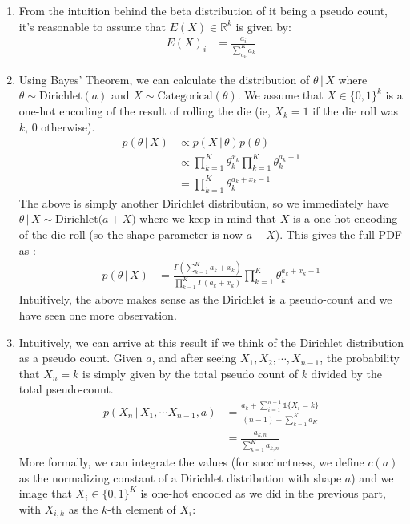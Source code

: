 \documentclass[submit]{harvardml}
\newcommand{\given}{\,|\,}
\theoremstyle{plain}
\begin{document}
\begin{enumerate}[label=(\alph*)]
\item From the intuition behind the beta distribution of it being a pseudo count, it's reasonable to assume that $E(X) \in \mathbb{R}^k$ is given by:
\begin{align*}
E(X)_i &= \frac{a_i}{\sum_{a_k}^K a_k}
\end{align*}
\item Using Bayes' Theorem, we can calculate the distribution of $\theta \given X$ where $\theta \sim \text{Dirichlet}(a)$ and $X \sim \text{Categorical}(\theta)$. We assume that $X \in \{0,1\}^k$ is a one-hot encoding of the result of rolling the die (ie, $X_k = 1$ if the die roll was $k$, $0$ otherwise).
\begin{align*}
p(\theta \given X) &\propto p(X \given \theta)p(\theta) \\
&\propto \prod_{k=1}^K \theta_k^{x_k} \prod_{k=1}^K \theta_k^{a_k-1} \\
&= \prod_{k=1}^K \theta_k^{a_k + x_k - 1}
\end{align*}
The above is simply another Dirichlet distribution, so we immediately have $\theta \given X \sim \text{Dirichlet($a + X$)}$ where we keep in mind that $X$ is a one-hot encoding of the die roll (so the shape parameter is now $a + X$). This gives the full PDF as :
\begin{align*}
p(\theta \given X) &= \frac{\Gamma(\sum_{k=1}^K{a_k+x_k})}{\prod_{k=1}^K \Gamma(a_k + x_k)}\prod_{k=1}^K \theta_k^{a_k + x_k - 1}
\end{align*}
Intuitively, the above makes sense as the Dirichlet is a pseudo-count and we have seen one more observation.
\item Intuitively, we can arrive at this result if we think of the Dirichlet distribution as a pseudo count. Given $a$, and after seeing $X_1,X_2, \cdots, X_{n-1}$, the probability that $X_n = k$ is simply given by the total pseudo count of $k$ divided by the total pseudo-count.
\begin{align*}
p(X_n \given X_1, \cdots X_{n-1}, a) &= \frac{a_k + \sum_{i=1}^{n-1}\mathbb{1}\{X_i = k\}}{(n-1) + \sum_{k=1}^K a_K} \\
&= \frac{a_{k,n}}{\sum_{k=1}^K a_{k,n}}
\end{align*}
More formally, we can integrate the values (for succinctness, we define $c(a)$ as the normalizing constant of a Dirichlet distribution with shape $a$) and we image that $X_i \in \{0,1\}^K$ is one-hot encoded as we did in the previous part, with $X_{i,k}$ as the $k$-th element of $X_i$:

\end{enumerate}
\end{document}
